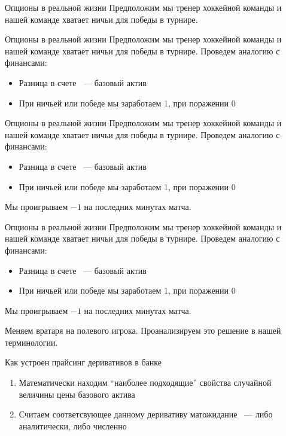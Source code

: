\documentclass{beamer}
\newcommand{\quotes}[1]{``#1''}
\begin{document}
    \begin{frame}{Опционы в реальной жизни}
        Предположим мы тренер хоккейной команды и нашей команде хватает ничьи для победы в турнире.
    \end{frame}

    \begin{frame}{Опционы в реальной жизни}
        Предположим мы тренер хоккейной команды и нашей команде хватает ничьи для победы в турнире.
        Проведем аналогию с финансами:
        \begin{itemize}
            \item Разница в счете ~--- базовый актив
            \item При ничьей или победе мы заработаем 1, при поражении 0
        \end{itemize}
    \end{frame}

    \begin{frame}{Опционы в реальной жизни}
        Предположим мы тренер хоккейной команды и нашей команде хватает ничьи для победы в турнире.
        Проведем аналогию с финансами:
        \begin{itemize}
            \item Разница в счете ~--- базовый актив
            \item При ничьей или победе мы заработаем 1, при поражении 0
        \end{itemize}
        Мы проигрываем $-1$ на последних минутах матча.
    \end{frame}

    \begin{frame}{Опционы в реальной жизни}
        Предположим мы тренер хоккейной команды и нашей команде хватает ничьи для победы в турнире.
        Проведем аналогию с финансами:
        \begin{itemize}
            \item Разница в счете ~--- базовый актив
            \item При ничьей или победе мы заработаем 1, при поражении 0
        \end{itemize}
        Мы проигрываем $-1$ на последних минутах матча.

        Меняем вратаря на полевого игрока.
        Проанализируем это решение в нашей терминологии.
    \end{frame}

    \begin{frame}{Как устроен прайсинг деривативов в банке}
        \begin{enumerate}
            \item Математически находим \quotes{наиболее подходящие} свойства случайной величины цены базового актива
            \item Считаем соответсвующее данному деривативу матожидание ~--- либо аналитически, либо численно
        \end{enumerate}
    \end{frame}
\end{document}
